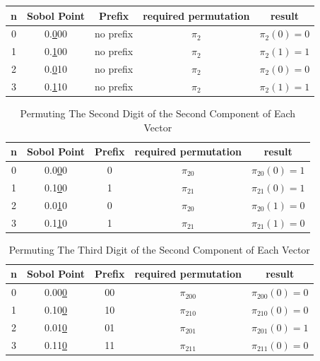 \documentclass{article}
\theoremstyle{definition}
\begin{document}
\begin{appendices}
\begin{table}[H]
\begin{tabular}{|c|c|c|c|c|}
    n & Sobol Point & Prefix & required permutation & result \\ \hline
    0 & 0.\underline{0}00 & no prefix & $\pi_2$ & $\pi_2(0)=0$ \\ \hline
    1 & 0.\underline{1}00 & no prefix & $\pi_2$ & $\pi_2(1)=1$ \\ \hline
    2 & 0.\underline{0}10 & no prefix & $\pi_2$ & $\pi_2(0)=0$ \\ \hline
    3 & 0.\underline{1}10 & no prefix & $\pi_2$ & $\pi_2(1)=1$ \\ \hline
  \end{tabular}
\end{table}
\begin{table}[H]       %
  \centering            %
  \caption{Permuting The Second Digit of the Second Component of Each Vector}
  \label{tab:5}
  \begin{tabular}{|c|c|c|c|c|}  %
    \hline
    n & Sobol Point & Prefix & required permutation & result \\ \hline
    0 & 0.0\underline{0}0 & 0 & $\pi_{20}$ & $\pi_{20}(0)=1$ \\ \hline
    1 & 0.1\underline{0}0 & 1 & $\pi_{21}$ & $\pi_{21}(0)=1$ \\ \hline
    2 & 0.0\underline{1}0 & 0 & $\pi_{20}$ & $\pi_{20}(1)=0$ \\ \hline
    3 & 0.1\underline{1}0 & 1 & $\pi_{21}$ & $\pi_{21}(1)=0$ \\ \hline
  \end{tabular}
  
\end{table}
\begin{table}[H]       %
  \centering            %
  \caption{Permuting The Third  Digit of the Second Component of Each Vector}
  \label{tab:6}
  \begin{tabular}{|c|c|c|c|c|}  %
    \hline
    n & Sobol Point & Prefix & required permutation & result \\ \hline
    0 & 0.00\underline{0} & 00 & $\pi_{200}$ & $\pi_{200}(0)=0$ \\ \hline
    1 & 0.10\underline{0} & 10 & $\pi_{210}$ & $\pi_{210}(0)=0$ \\ \hline
    2 & 0.01\underline{0} & 01 & $\pi_{201}$ & $\pi_{201}(0)=1$ \\ \hline
    3 & 0.11\underline{0} & 11 & $\pi_{211}$ & $\pi_{211}(0)=0$ \\ \hline
  \end{tabular}
  

\end{table}
\end{appendices}
\end{document}
